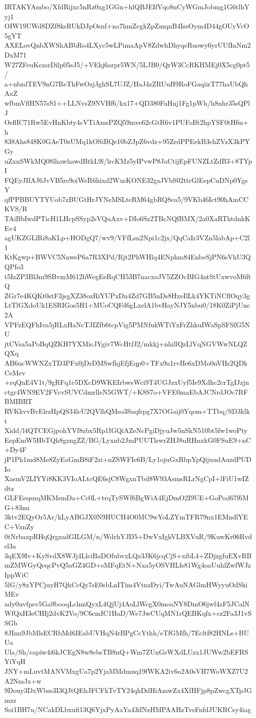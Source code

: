 IRTAKYAmbo/XfdRijxc5nRz0xg1GGn+hlQBJEIfVqo8nCyWGmJobmg1G6tlhYyj1
OIW19UWd8DZf8ksRUkDJpOsnf+na7hmZcgkZpZmqnB4IssOym4D44gOUyVcO5gYT
AXELovQnbXWShABbRo4LXyc5wLPimaApV8ZdwhDhyqeRuowy6yrUUfInNm2DxM71
W27ZFeuKsxsrDilp05sJ5/+VEkj6arpr5WN/5LJB0/QrW3CcRKHMEj0X5cg0pt5/
a+nbzdTEV9nG7ReThFwOzjJghSL7UJZ/HaJ4zZRUuH9RoFGaqiirT77haUbQhAxZ
wfbmVflHN57sS1++LLNvsZ9NVHf6/kx17+QD380FaHnj1Fg1pWh/h8nhr35sQPlJ
OsflIC71Rw5EvHnKbty4cVTiAmsPZQ59mve62cGtR6v1PUFoIft2hpYSF0tH6n+h
838Ahs848K0GAeT0zUMq1kOSiBQe10bZJpZ6vdz+95ZrdPPEekB3chZVzX3kPYGy
uZxnSWkMQ08lhawhawdBtkL9l/lrcKMz5yIPvwP8JaCtijEpFUNZLtZdB3+8TYpI
FQEyJIfAJ6JvVB5re9oiWeR6hixd2WxsKONE32gaJVbS02ttrGlEepCuDNp0YgsY
qfPPBBUYTYUob7zBUGtHrJYNeMSLteRM64gbRQ8ea5/9VKb46Ict90hAmCCKVS/R
TAiBbIwdPTicH1LHcpSSyp2sVQuAxv+DIo6Sz2TBcNQfBMX/2a0XaRThtdnkKEv4
agUKZGLlRi8aKLp+HODgQ7/wv9/VFfLsn2Npi1c2jx/QqCaIr3VZn5labAp+C2l1
KtKgwp+BWVC5NnweP6a7R3XPd/Rjt2PhWHlq4ENphm84EnbeSjPN6sVhU3QQPfo3
t5IzZP3Bl3m9SBvmM612hWegEeRqCH53B7nacxoJV5ZZOcBIG4ntStUxwvoM6ftQ
ZGr7e4KQKt0stF3jsgXZ38ozRiYUPxDn4Zd7GB5nDs8HxeIlLk4YKTiNCflOqy3g
LtTlGXdoUk1ESRIGos5H1+MUoCQFd6gLxelA1bvHayNJY5nbu0/18K0ZiPjUnc2A
VPFzEQFhIva5jRLxHaNcTJIZfb6tcpVig5PMNfukWTiYxFrZhkuIWaSpSFSfG5NU
jtCVsa5aPoBqQZKH7YXMicJYgiv7WcHtfJ2/mkkj+nhillQzLlVqNGVWwNLQZQXq
AB6ucWWNZxTD3PFx0jDrDMSwfhjEfjEqp0+TFx9a1rvHe6xDMo0nVHs2QDkCeMev
+rqQnE4V1t/9gRFq1c5DXcD9WKEIrbwsWci9T4UGJzxUyf5Ie9Xdhc2crTgIJzjn
ctgr4WN9EV2FVcvSUVCdmrlleN5GWT/+K8S7o+VFE0maEbAJCNrdJOc7RFBMIBRT
RVKkvvBvElrzHpQS34lcU2QVlhQMso3Saqfrpg7X7OGaij0Yqom+TTbq/SD3klkt
Xidd/l4QTCEGjpohYVf8zbx5Rp1IGQiAZeNcPgiDjyuJw5nSkN510bt5fw1woPty
EepEmW5HbTQh8gzngZZ/BG/Lyxnb2JmPUUTlswrZHJ8uRHnxkG0FSuE9+nC+Dy4F
jP1Ph1md8Me8ZyEaGmB8iF2zi+nZSWFIe6B/Ly1ojuGxRbpYpQijuudAuzdPUDIo
XasmV2LIYYi8KK3VIoALtcQE6sjC8WgxnTbd8W93AsmsRLrNgCpI+lFiU1wIZdtz
GLFEeqsnqMKMsmDa+Cc0L+trqTySWf6BgWiA4EjDmO2I9UE+GoPod67f6MG+83nu
3ktv2EQyOr5Ar/kLyABGJX0N9HUCH4O0MC9wYoLZYmTFR79nx1EMndlYEC+VznZy
0tNrbaxpRHqQrgzadGILGM/n/WdrhYJD5+DwVxIgkVLBXVuR/9KuwKr06Rvdsl3a
3qEX9Iv+KySvdX8WJj4LlciBaDOfubvxLQz3JK6jcqCjS+xibL4+ZDjzgfuEXvRB
mZMWGyQeqcPvQ5aGZ4GD+sMFqEtN+Nxa5yOSVHLfs81Wg4oaUuhlZwfWJzIppWiC
5lG/y8xYPCjuyH7QhCcQy7sE0sbLnITim4VtnzDyi/TwAuNAGlmHWyyuOdSkiMEv
ady0uvfpsv5Ga9booqLclnnQyxL4QjUj4AoLlWcgX0moaNY8DmO6jwf4zF5JCalN
WfQxH3eCHIj2dvK2Vo/9C6cmIC1HaD/We7JwCUqMN1rQEBKqfx+cz2Fa3J1vSSGb
8JInn9JbMlsECRbMd6IEabUVHqN4rBPgCcYthh/eTfGMfh/7Ecltf82HNLs+BUUa
Ula/Sh/eapiw4i6kJCEgN8w8ebsTB8nQ+Wm7ZUnGsWXdLUzx1JUWw2bEFRSYiYqH
JNY+mLuvtMANVMxgUa7p2YjaMMdmnq19fWKA2iv6o2A0sVH7WoWXZ7U2A2NmJx+w
9Douy3DxWbss3I3QJtQEhJFCFkTvTY24qhDdHiAmwZx4XfHFjp8pZwcgXTpJGmzz
Soi1BH7u/NCakDLbxufi13Q6YjxPyAaYa43ifNzHMPAAHzTvsFnfdJUKRCsy4iag
